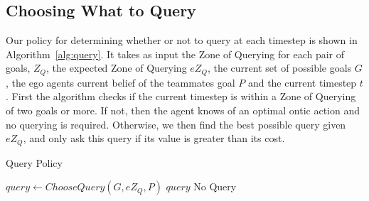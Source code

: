 \documentclass[letterpaper]{article}
\begin{document}
\subsection{Choosing What to Query}


Our policy for determining whether or not to query at each timestep is shown in Algorithm~\ref{alg:query}. It takes as input the Zone of Querying for each pair of goals, $Z_Q$, the expected Zone of Querying $eZ_Q$, the current set of possible goals $G$, the ego agents current belief of the teammates goal $P$ and the current timestep $t$. First the algorithm checks if the current timestep is within a Zone of Querying of two goals or more. If not, then the agent knows of an optimal ontic action and no querying is required. Otherwise, we then find the best possible query given $eZ_Q$, and only ask this query if its value is greater than its cost.
\begin{algorithm}[t]
\caption{Query Policy}
\begin{algorithmic}
\State $query \gets ChooseQuery(G, eZ_Q, P)$
\State \Return $query$
\EndIf
\EndIf
\State \Return No Query
\EndProcedure
\end{algorithmic}
\label{alg:query}
\end{algorithm}
\end{document}
